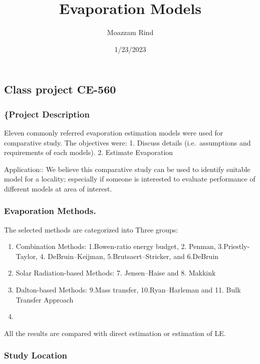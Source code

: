 \documentclass[
]{article}
\title{Evaporation Models}
\author{Moazzam Rind}
\date{1/23/2023}
\providecommand{\tightlist}{%
  \setlength{\itemsep}{0pt}\setlength{\parskip}{0pt}}
\begin{document}
\maketitle

\hypertarget{class-project-ce-560}{%
\subsection{Class project CE-560}\label{class-project-ce-560}}

\hypertarget{project-description}{%
\subsubsection{\{Project Description}\label{project-description}}

Eleven commonly referred evaporation estimation models were used for
comparative study. The objectives were: 1. Discuss details
(i.e.~assumptions and requirements of each models). 2. Estimate
Evaporation

Application:: We believe this comparative study can be used to identify
suitable model for a locality; especially if someone is interested to
evaluate performance of different models at area of interest.

\hypertarget{evaporation-methods.}{%
\subsubsection{Evaporation Methods.}\label{evaporation-methods.}}

The selected methods are categorized into Three groups:

\begin{enumerate}
\def\labelenumi{\alph{enumi}.}
\tightlist
\item
  Combination Methods: 1.Bowen-ratio energy budget, 2. Penman,
  3.Priestly-Taylor, 4. DeBruin--Keijman, 5.Brutsaert--Stricker, and
  6.DeBruin\\
\item
  Solar Radiation-based Methods: 7. Jensen--Haise and 8. Makkink
\item
  Dalton-based Methods: 9.Mass transfer, 10.Ryan--Harleman and 11. Bulk
  Transfer Approach
\item
\end{enumerate}

All the results are compared with direct estimation or estimation of LE.

\hypertarget{study-location}{%
\subsubsection{Study Location}\label{study-location}}
\end{document}
